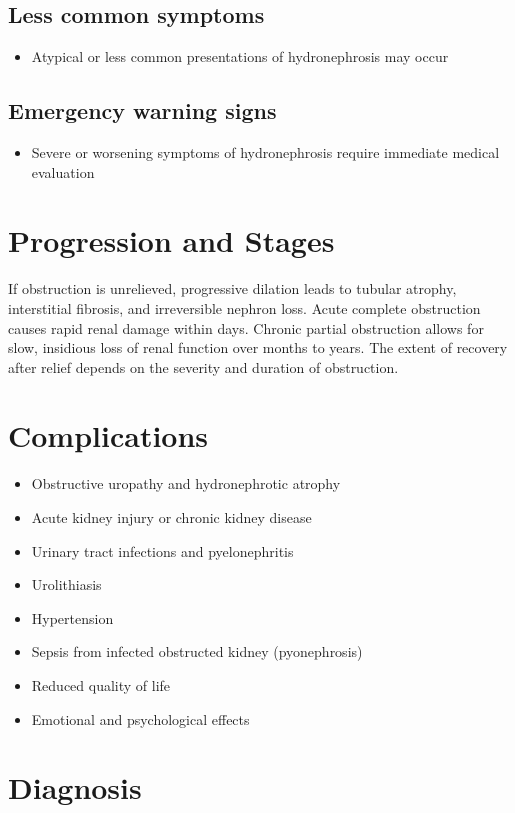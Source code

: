 \subsection{Less common symptoms}
\begin{itemize}[noitemsep]
  \item Atypical or less common presentations of hydronephrosis may occur
\end{itemize}

\subsection{Emergency warning signs}
\begin{itemize}[noitemsep]
  \item Severe or worsening symptoms of hydronephrosis require immediate medical evaluation
\end{itemize}
\section{Progression and Stages}
If obstruction is unrelieved, progressive dilation leads to tubular atrophy, interstitial fibrosis, and irreversible nephron loss. Acute complete obstruction causes rapid renal damage within days. Chronic partial obstruction allows for slow, insidious loss of renal function over months to years. The extent of recovery after relief depends on the severity and duration of obstruction.

\section{Complications}

\begin{itemize}[noitemsep]
  \item Obstructive uropathy and hydronephrotic atrophy
  \item Acute kidney injury or chronic kidney disease
  \item Urinary tract infections and pyelonephritis
  \item Urolithiasis
  \item Hypertension
  \item Sepsis from infected obstructed kidney (pyonephrosis)
  \item Reduced quality of life
  \item Emotional and psychological effects
\end{itemize}

\section{Diagnosis}

